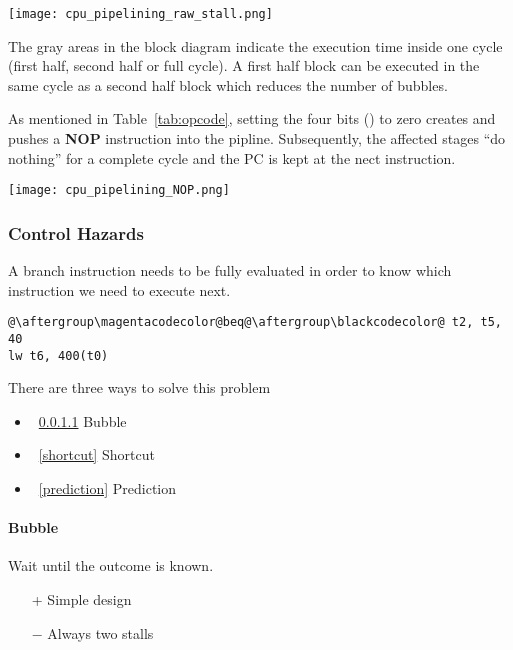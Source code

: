 \begin{multicols*}{2}
    \texttt{[image: cpu\_pipelining\_raw\_stall.png]}

    The gray areas in the block diagram indicate the execution time inside one cycle (first half, second half or full cycle). A first half block can be executed in the same cycle as a second half block which reduces the number of bubbles.

    \newpar{}
    As mentioned in Table~\ref{tab:opcode}, setting the four bits () to zero creates and pushes a \textbf{NOP} instruction into the pipline.
    Subsequently, the affected stages ``do nothing'' for a complete cycle and the PC is kept at the nect instruction.
    \begin{center}
        \texttt{[image: cpu\_pipelining\_NOP.png]}
    \end{center}

    \subsubsection{Control Hazards}\label{control hazards}

    A branch instruction needs to be fully evaluated in order to know which instruction we need to execute next.

    \begin{lstlisting}[escapechar=@]
@\aftergroup\magentacodecolor@beq@\aftergroup\blackcodecolor@ t2, t5, 40
lw t6, 400(t0)
\end{lstlisting}

    There are three ways to solve this problem
    \begin{itemize}
        \item~\ref{bubble} Bubble
        \item~\ref{shortcut} Shortcut
        \item~\ref{prediction} Prediction
    \end{itemize}

    \paragraph{Bubble}\label{bubble}

    Wait until the outcome is known.
    \begin{itemize}
        \item[+] Simple design
        \item[$-$] Always two stalls
    \end{itemize}


\end{multicols*}
